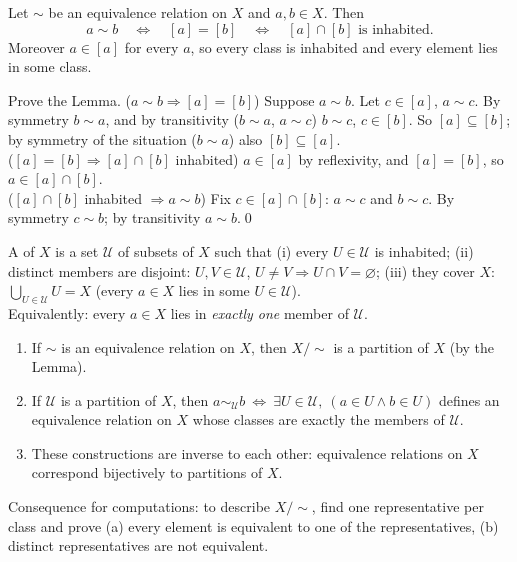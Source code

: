\begin{result}
Let $\sim$ be an equivalence relation on $X$ and $a,b\in X$. Then
\[
a\sim b\quad\Leftrightarrow\quad[a]=[b]\quad\Leftrightarrow\quad[a]\cap[b]\text{ is inhabited.}
\]
Moreover $a\in[a]$ for every $a$, so every class is inhabited and every element lies in some class.
\end{result}

\begin{hexample}
Prove the Lemma.
\solution
($a\sim b\Rightarrow[a]=[b]$) Suppose $a\sim b$. Let $c\in[a]$, \ie $a\sim c$. By symmetry $b\sim a$, and by transitivity ($b\sim a$, $a\sim c$) $b\sim c$, \ie $c\in[b]$. So $[a]\subseteq[b]$; by symmetry of the situation ($b\sim a$) also $[b]\subseteq[a]$.\\
($[a]=[b]\Rightarrow[a]\cap[b]$ inhabited) $a\in[a]$ by reflexivity, and $[a]=[b]$, so $a\in[a]\cap[b]$.\\
($[a]\cap[b]$ inhabited $\Rightarrow a\sim b$) Fix $c\in[a]\cap[b]$: $a\sim c$ and $b\sim c$. By symmetry $c\sim b$; by transitivity $a\sim b$.\qed
\end{hexample}

\begin{key}[Partition]
A  of $X$ is a set $\mathcal U$ of subsets of $X$ such that
(i) every $U\in\mathcal U$ is inhabited; (ii) distinct members are disjoint: $U,V\in\mathcal U$, $U\neq V\Rightarrow U\cap V=\varnothing$; (iii) they cover $X$: $\bigcup_{U\in\mathcal U}U=X$ (every $a\in X$ lies in some $U\in\mathcal U$).\\
Equivalently: every $a\in X$ lies in \emph{exactly one} member of $\mathcal U$.
\end{key}

\begin{result}[Fundamental theorem: equivalence relations $=$ partitions]
\begin{enumerate}
\item If $\sim$ is an equivalence relation on $X$, then $X/{\sim}$ is a partition of $X$ (by the Lemma).
\item If $\mathcal U$ is a partition of $X$, then $a\sim_{\mathcal U}b\ \Leftrightarrow\ \exists U\in\mathcal U,\ (a\in U\wedge b\in U)$ defines an equivalence relation on $X$ whose classes are exactly the members of $\mathcal U$.
\item These constructions are inverse to each other: equivalence relations on $X$ correspond bijectively to partitions of $X$.
\end{enumerate}
\end{result}
Consequence for computations: to describe $X/{\sim}$, find one representative per class and prove (a) every element is equivalent to one of the representatives, (b) distinct representatives are not equivalent.


